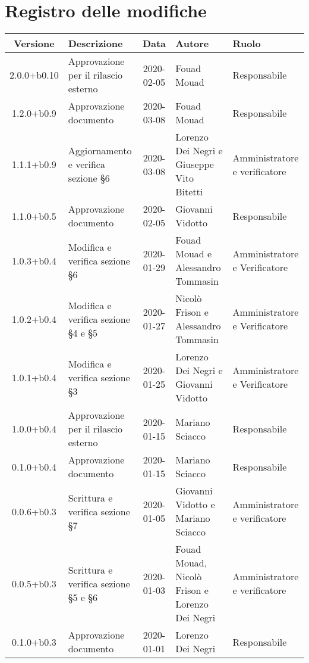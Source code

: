 \section*{Registro delle modifiche}

\begin{center}
	\begin{longtable}{|c|p{3.5cm}|c|p{3cm}|p{3cm}|}
	\hline
	\rowcolor{lighter-grayer}
	\textbf{Versione} & \textbf{Descrizione} & \textbf{Data} & \textbf{Autore} & \textbf{Ruolo} \\
	\hline
	\endfirsthead


	2.0.0+b0.10 & Approvazione per il rilascio esterno & 2020-02-05 & Fouad Mouad & Responsabile \\
	\hline
	1.2.0+b0.9 & Approvazione documento & 2020-03-08 & Fouad Mouad & Responsabile \\
	\hline
	1.1.1+b0.9 & Aggiornamento e verifica sezione \S6  & 2020-03-08 & Lorenzo Dei Negri e Giuseppe Vito Bitetti & Amministratore e verificatore \\
	\hline
	1.1.0+b0.5 & Approvazione documento & 2020-02-05 & Giovanni Vidotto & Responsabile \\
	\hline 
	1.0.3+b0.4 & Modifica e verifica sezione \S6 & 2020-01-29 & Fouad Mouad e Alessandro Tommasin & Amministratore e Verificatore \\
	\hline
	1.0.2+b0.4 & Modifica e verifica sezione \S4 e \S5 & 2020-01-27 & Nicolò Frison e Alessandro Tommasin & Amministratore e Verificatore \\
	\hline
	1.0.1+b0.4 & Modifica e verifica sezione \S3 & 2020-01-25 & Lorenzo Dei Negri e Giovanni Vidotto & Amministratore e Verificatore \\
	\hline
	1.0.0+b0.4 & Approvazione per il rilascio esterno & 2020-01-15 & Mariano Sciacco & Responsabile \\
	\hline
	0.1.0+b0.4 & Approvazione documento & 2020-01-15 & Mariano Sciacco & Responsabile \\
	\hline 
	0.0.6+b0.3 & Scrittura e verifica sezione \S7  & 2020-01-05 & Giovanni Vidotto e Mariano Sciacco & Amministratore e verificatore \\
	\hline 
	0.0.5+b0.3 & Scrittura e verifica sezione \S5 e \S6  & 2020-01-03 & Fouad Mouad, Nicolò Frison e Lorenzo Dei Negri & Amministratore e verificatore \\
	\hline
	0.1.0+b0.3 & Approvazione documento & 2020-01-01 & Lorenzo Dei Negri & Responsabile \\ 

\end{longtable}
\end{center}
